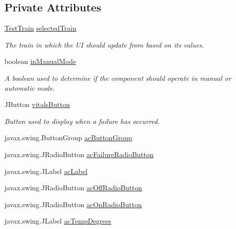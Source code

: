 \subsection*{Private Attributes}
\begin{DoxyCompactItemize}
\item 
\hyperlink{classTrainControllerComps_1_1TestTrain}{Test\+Train} \hyperlink{classTrainControllerComps_1_1TCUtilityPanel_a388880b551cbeb207c917c81da91baae}{selected\+Train}
\begin{DoxyCompactList}\small\item\em The train in which the UI should update from based on its values. \end{DoxyCompactList}\item 
boolean \hyperlink{classTrainControllerComps_1_1TCUtilityPanel_a40f9c46d00814e56f643a4d6dfc34364}{in\+Manual\+Mode}
\begin{DoxyCompactList}\small\item\em A boolean used to determine if the component should operate in manual or automatic mode. \end{DoxyCompactList}\item 
J\+Button \hyperlink{classTrainControllerComps_1_1TCUtilityPanel_a8d0c793041cf07bd154325e0288bf7c6}{vitals\+Button}
\begin{DoxyCompactList}\small\item\em Button used to display when a failure has occurred. \end{DoxyCompactList}\item 
javax.\+swing.\+Button\+Group \hyperlink{classTrainControllerComps_1_1TCUtilityPanel_a99c0c4bdd6c42094dcdb9c553fc92aca}{ac\+Button\+Group}
\item 
javax.\+swing.\+J\+Radio\+Button \hyperlink{classTrainControllerComps_1_1TCUtilityPanel_ab0f5fa367c6967e1e44178e88817c839}{ac\+Failure\+Radio\+Button}
\item 
javax.\+swing.\+J\+Label \hyperlink{classTrainControllerComps_1_1TCUtilityPanel_af2d327540499b3ab0cda1c5db02d1b48}{ac\+Label}
\item 
javax.\+swing.\+J\+Radio\+Button \hyperlink{classTrainControllerComps_1_1TCUtilityPanel_a7ecb1a4d7548a9626c05406474ddab6a}{ac\+Off\+Radio\+Button}
\item 
javax.\+swing.\+J\+Radio\+Button \hyperlink{classTrainControllerComps_1_1TCUtilityPanel_aab342cc326f305cf6ba11939db9cb517}{ac\+On\+Radio\+Button}
\item 
javax.\+swing.\+J\+Label \hyperlink{classTrainControllerComps_1_1TCUtilityPanel_aa3a9dd96541b8343ba7358aab1a8d3b2}{ac\+Temp\+Degrees}

\end{DoxyCompactItemize}
